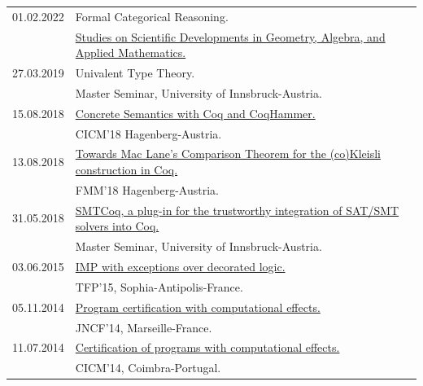 \documentclass[a4paper,9pt]{article} %
\begin{document}
\begin{longtable}{ll}
{\normalsize 01.02.2022} & {Formal Categorical Reasoning.}\\
&
 \href{https://etkinlik.ulakbim.gov.tr/event/12/}{Studies on Scientific Developments in Geometry, Algebra, and Applied
Mathematics.}\\[0.25cm]
{\normalsize 27.03.2019} & {Univalent Type Theory.}\\
& Master Seminar, University of Innsbruck-Austria.\\[0.25cm]
{\normalsize15.08.2018} & \href{https://cicm-conference.org/2018/slides/T16.pdf}{Concrete Semantics with Coq and
CoqHammer.}\\
& CICM'18 Hagenberg-Austria.\\[0.25cm]
{\normalsize13.08.2018} & \href{https://cicm-conference.org/2018/slides/FMM5.pdf}{Towards Mac Lane's Comparison Theorem for the (co)Kleisli construction in Coq.}\\
& FMM'18 Hagenberg-Austria.\\[0.25cm]
{\normalsize31.05.2018} & \href{http://cl-informatik.uibk.ac.at/teaching/ss18/ms2/slides/BE.pdf}{SMTCoq, a plug-in for the trustworthy integration of SAT/SMT solvers into Coq.}\\
& Master Seminar, University of Innsbruck-Austria.\\[0.25cm]
{\normalsize03.06.2015} & \href{ftp://ftp-sop.inria.fr/indes/TFP15/TFP2015_talk_6.pdf}{ IMP with exceptions over decorated logic.} \\
& TFP'15, Sophia-Antipolis-France.\\[0.25cm]
{\normalsize05.11.2014} & \href{http://www.lifl.fr/jncf2014/files/slides/ekici.pdf}{Program certification with computational effects.}\\
& JNCF'14, Marseille-France.\\[0.25cm]
{\normalsize11.07.2014} & \href{http://ljk.imag.fr/membres/Burak.Ekici/CICM14/BurakEkici_presentation.pdf}{ Certification of programs with computational effects.} \\
& CICM'14, Coimbra-Portugal.\\[0.25cm]

\end{longtable}
\end{document}
